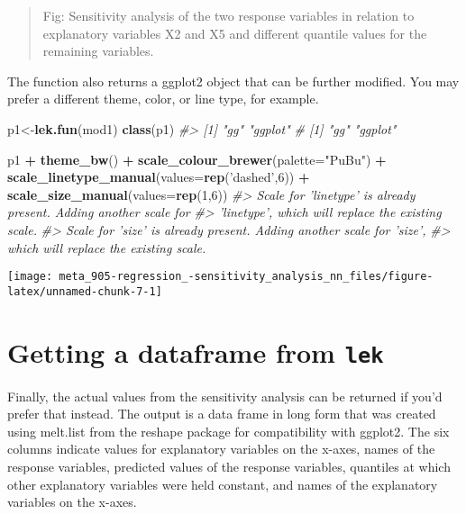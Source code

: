 \documentclass[]{book}
\newenvironment{Shaded}{\begin{snugshade}}{\end{snugshade}}
\newcommand{\CommentTok}[1]{\textcolor[rgb]{0.56,0.35,0.01}{\textit{#1}}}
\newcommand{\DataTypeTok}[1]{\textcolor[rgb]{0.13,0.29,0.53}{#1}}
\newcommand{\DecValTok}[1]{\textcolor[rgb]{0.00,0.00,0.81}{#1}}
\newcommand{\KeywordTok}[1]{\textcolor[rgb]{0.13,0.29,0.53}{\textbf{#1}}}
\newcommand{\NormalTok}[1]{#1}
\newcommand{\OperatorTok}[1]{\textcolor[rgb]{0.81,0.36,0.00}{\textbf{#1}}}
\newcommand{\StringTok}[1]{\textcolor[rgb]{0.31,0.60,0.02}{#1}}
\begin{document}
\begin{quote}
Fig: Sensitivity analysis of the two response variables in relation to explanatory variables X2 and X5 and different quantile values for the remaining variables.
\end{quote}

The function also returns a ggplot2 object that can be further modified. You may prefer a different theme, color, or line type, for example.

\begin{Shaded}
\begin{Highlighting}[]
\NormalTok{p1<-}\KeywordTok{lek.fun}\NormalTok{(mod1)}
\KeywordTok{class}\NormalTok{(p1)}
\CommentTok{#> [1] "gg"     "ggplot"}
\CommentTok{# [1] "gg"     "ggplot"}
 
\NormalTok{p1 }\OperatorTok{+}\StringTok{ }
\StringTok{   }\KeywordTok{theme_bw}\NormalTok{() }\OperatorTok{+}
\StringTok{   }\KeywordTok{scale_colour_brewer}\NormalTok{(}\DataTypeTok{palette=}\StringTok{"PuBu"}\NormalTok{) }\OperatorTok{+}
\StringTok{   }\KeywordTok{scale_linetype_manual}\NormalTok{(}\DataTypeTok{values=}\KeywordTok{rep}\NormalTok{(}\StringTok{'dashed'}\NormalTok{,}\DecValTok{6}\NormalTok{)) }\OperatorTok{+}
\StringTok{   }\KeywordTok{scale_size_manual}\NormalTok{(}\DataTypeTok{values=}\KeywordTok{rep}\NormalTok{(}\DecValTok{1}\NormalTok{,}\DecValTok{6}\NormalTok{))}
\CommentTok{#> Scale for 'linetype' is already present. Adding another scale for}
\CommentTok{#> 'linetype', which will replace the existing scale.}
\CommentTok{#> Scale for 'size' is already present. Adding another scale for 'size',}
\CommentTok{#> which will replace the existing scale.}
\end{Highlighting}
\end{Shaded}

\begin{center}\texttt{[image: meta\_905-regression\_-sensitivity\_analysis\_nn\_files/figure-latex/unnamed-chunk-7-1]} \end{center}

\hypertarget{getting-a-dataframe-from-lek}{%
\section{\texorpdfstring{Getting a dataframe from \texttt{lek}}{Getting a dataframe from lek}}\label{getting-a-dataframe-from-lek}}

Finally, the actual values from the sensitivity analysis can be returned if you'd prefer that instead. The output is a data frame in long form that was created using melt.list from the reshape package for compatibility with ggplot2. The six columns indicate values for explanatory variables on the x-axes, names of the response variables, predicted values of the response variables, quantiles at which other explanatory variables were held constant, and names of the explanatory variables on the x-axes.
\end{document}
